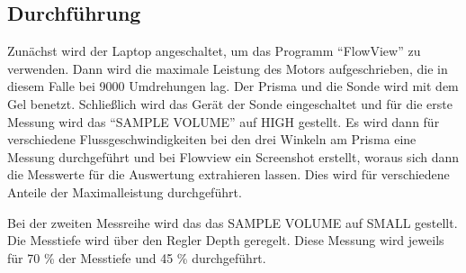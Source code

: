 \subsection{Durchführung}
Zunächst wird der Laptop angeschaltet, um das Programm \enquote{FlowView} zu verwenden.
Dann wird die maximale Leistung des Motors aufgeschrieben, die in diesem Falle bei 9000 Umdrehungen lag.
Der Prisma und die Sonde wird mit dem Gel benetzt.
Schließlich wird das Gerät der Sonde eingeschaltet und für die erste Messung wird das \enquote{SAMPLE VOLUME} auf HIGH gestellt.
Es wird dann für verschiedene Flussgeschwindigkeiten bei den drei Winkeln am Prisma eine Messung durchgeführt
und bei Flowview ein Screenshot erstellt, woraus sich dann die Messwerte für die Auswertung extrahieren lassen.
Dies wird für verschiedene Anteile der Maximalleistung durchgeführt.

Bei der zweiten Messreihe wird das das SAMPLE VOLUME auf SMALL gestellt.
Die Messtiefe wird über den Regler Depth geregelt.
Diese Messung wird jeweils für 70 \% der Messtiefe und 45 \% durchgeführt.